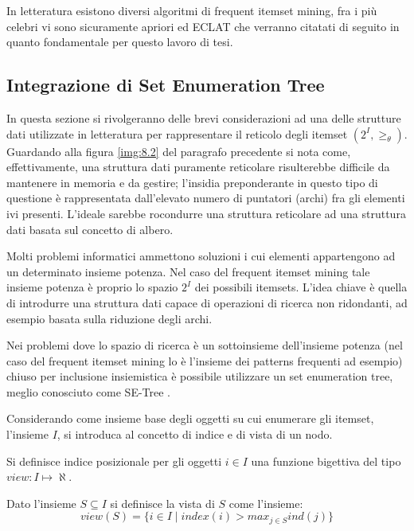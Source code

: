 In letteratura esistono diversi algoritmi di frequent itemset mining, fra i pi{\`u} celebri vi sono sicuramente apriori \cite{apriori} ed ECLAT \cite{eclat} che verranno citatati di seguito in quanto fondamentale per questo lavoro di tesi.

\subsection{Integrazione di Set Enumeration Tree}

In questa sezione si rivolgeranno delle brevi considerazioni ad una delle strutture dati utilizzate in letteratura per rappresentare il reticolo degli itemset $(2^I, \geq_{\theta})$. Guardando alla figura \ref{img:8.2} del paragrafo precedente si nota come, effettivamente, una struttura dati puramente reticolare risulterebbe difficile da mantenere in memoria e da gestire; l'insidia preponderante in questo tipo di questione {\`e} rappresentata dall'elevato numero di puntatori (archi) fra gli elementi ivi presenti. L'ideale sarebbe rocondurre una struttura reticolare ad una struttura dati basata sul concetto di albero.

Molti problemi informatici ammettono soluzioni i cui elementi appartengono ad un determinato insieme potenza. Nel caso del frequent itemset mining tale insieme potenza {\`e} proprio lo spazio \( 2^I \) dei possibili itemsets. L'idea chiave {\`e} quella di introdurre una struttura dati capace di operazioni di ricerca non ridondanti, ad esempio basata sulla riduzione degli archi. 

Nei problemi dove lo spazio di ricerca {\`e} un sottoinsieme dell'insieme potenza (nel caso del frequent itemset mining lo {\`e} l'insieme dei patterns frequenti ad esempio) chiuso per inclusione insiemistica {\`e} possibile utilizzare un set enumeration tree, meglio conosciuto come SE-Tree \cite{se-tree}.

Considerando come insieme base degli oggetti su cui enumerare gli itemset, l'insieme \( I \), si introduca al concetto di indice e di vista di un nodo.

\begin{defn}
Si definisce indice posizionale per gli oggetti $i \in I$ una funzione bigettiva del tipo $view:I \mapsto \aleph$.
\end{defn}

\begin{defn}
Dato l'insieme $S \subseteq I$ si definisce la vista di $S$ come l'insieme:
\begin{equation}
view(S) = \lbrace i \in I \mid index(i) > max_{j \in S}ind(j) \rbrace
\end{equation}
\end{defn}

